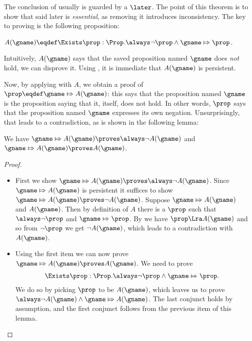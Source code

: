 The conclusion of  usually is guarded by a $\later$.
The point of this theorem is to show that said later is \emph{essential}, as removing it introduces inconsistency.
%
The key to proving  is the following proposition:
\begin{defn}
$A(\gname) \eqdef \Exists \prop : \Prop. \always\lnot \prop \land \gname \Mapsto \prop$.
\end{defn}
Intuitively, $A(\gname)$ says that the saved proposition named $\gname$ does \emph{not} hold, \ie we can disprove it.
Using , it is immediate that $A(\gname)$ is persistent.

Now, by applying  with $A$, we obtain a proof of $\prop \eqdef \gname \Mapsto A(\gname)$: this says that the proposition named $\gname$ is the proposition saying that it, itself, does not hold.
In other words, $\prop$ says that the proposition named $\gname$ expresses its own negation.
Unsurprisingly, that leads to a contradiction, as is shown in the following lemma:
\begin{lem}   \label{lem:saved-prop-counterexample-not-agname}   We have $\gname \Mapsto A(\gname) \proves \always\lnot A(\gname)$ and $\gname \Mapsto A(\gname) \proves A(\gname)$. \end{lem}
\begin{proof}%
\leavevmode
  \begin{itemize}
  \item First we show $\gname \Mapsto A(\gname) \proves \always\lnot A(\gname)$.
    Since $\gname \Mapsto A(\gname)$ is persistent it suffices to show $\gname \Mapsto A(\gname) \proves \lnot A(\gname)$.
    Suppose $\gname \Mapsto A(\gname)$ and $A(\gname)$.
    Then by definition of \(A\) there is a $\prop$ such that $\always \lnot \prop$ and $\gname \Mapsto \prop$.
    By  we have $\prop \Lra A(\gname)$ and so from $\lnot \prop$ we get $\lnot A(\gname)$, which leads to a contradiction with $A(\gname)$.
    
  \item Using the first item we can now prove $\gname \Mapsto A(\gname) \proves A(\gname)$.
    We need to prove
    \begin{align*}
      \Exists \prop : \Prop. \always \lnot \prop \land \gname \Mapsto \prop.
    \end{align*}
    We do so by picking $\prop$ to be $A(\gname)$, which leaves us to prove \(\always \lnot A(\gname) \land \gname \Mapsto A(\gname)\).
    The last conjunct holds by assumption, and the first conjunct follows from the previous item of this lemma.
  \end{itemize}
\end{proof}

